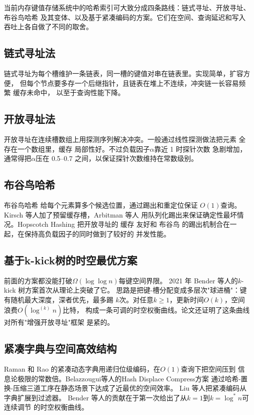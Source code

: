 \documentclass[
    type = bachelor,
    fontset = win,
    decl-page = true,
  ]{njuthesis}
\begin{document}
当前内存键值存储系统中的哈希索引可大致分成四条路线：链式寻址、开放寻址、
布谷鸟哈希 及其变体、以及基于紧凑编码的方案。它们在空间、查询延迟和写入
吞吐上各自做了不同的取舍。

\subsection{链式寻址法}

链式寻址为每个槽维护一条链表，同一槽的键值对串在链表里。实现简单，扩容方便，
但每个节点要多存一个后继指针，且链表在堆上不连续，冲突链一长容易频繁 缓存未命中，
以至于查询性能下降。

\subsection{开放寻址法}

开放寻址在连续槽数组上用探测序列解决冲突。一般通过线性探测做法把元素
全存在一个数组里，缓存 局部性好。不过负载因子$\alpha$靠近 1 时探针次数
急剧增加，通常得把$\alpha$压在 0.5--0.7 之间，以保证探针次数维持在常数级别。

\subsection{布谷鸟哈希}

布谷鸟哈希\cite{4} 给每个元素算多个候选位置，通过踢出和重定位保证
$O(1)$查询。Kirsch 等人\cite{17}加了预留缓存槽，Arbitman 等人\cite{8}
用队列化踢出来保证确定性最坏情况。Hopscotch Hashing\cite{18} 把开放寻址的
缓存 友好和 布谷鸟 的踢出机制合在一起，在保持高负载因子的同时做到了较好的
并发性能。

\subsection{基于k-kick树的时空最优方案}

前面的方案都没能打破$\Omega(\log\log n)$每键空间界限。
2021 年 Bender 等人的$k$-kick 树方案\cite{1}首次从理论上突破了它。
思路是把键-槽分配变成多层次"球进桶"：键有随机最大深度，深者优先，最多踢
$k$次。对任意$k \ge 1$，更新时间$O(k)$，空间浪费$O(\log^{(k)} n)$比特，
构成一条可调的时空权衡曲线。论文还证明了这条曲线对所有"增强开放寻址"框架
是紧的\cite{1}。

\subsection{紧凑字典与空间高效结构}

Raman 和 Rao\cite{12} 的紧凑动态字典用递归位级编码，在$O(1)$查询下把空间压到
信息论极限的常数倍。Belazzougui等人的Hash Displace Compress方案\cite{6}
通过哈希-置换-压缩三道工序在静态场景下达成了近最优的空间效率。
Liu 等人\cite{11}把紧凑编码从字典扩展到过滤器。
Bender 等人\cite{1}的贡献在于第一次给出了从$k=1$到$k=\log^* n$可连续调节
的时空权衡曲线。
\end{document}
